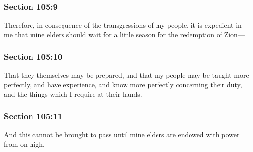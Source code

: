 	\subsubsection{Section 105:9} %
		\label{DC105-9}

		Therefore, in consequence of the transgressions of my people, it is expedient in me that mine elders should wait for a little season for the redemption of Zion—


	\subsubsection{Section 105:10} %
		\label{DC105-10}

		That they themselves may be prepared, and that my people may be taught more perfectly, and have experience, and know more perfectly concerning their duty, and the things which I require at their hands.


	\subsubsection{Section 105:11} %
		\label{DC105-11}

		And this cannot be brought to pass until mine elders are endowed with power from on high.


